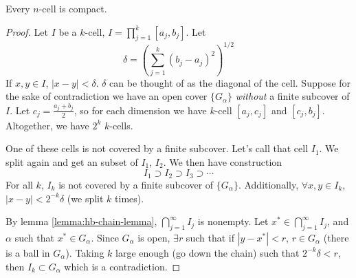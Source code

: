\begin{lemma}
    Every $n$-cell is compact.
\end{lemma}
\begin{proof}
    Let $I$ be a $k$-cell, $I = \prod_{j=1}^k[a_j, b_j]$. Let
    \[\delta = \left( \sum_{j=1}^k (b_j - a_j)^2 \right)^{1/2}\]
    If $x, y\in I$, $|x - y| < \delta$. $\delta$ can be thought of as the diagonal of the cell. Suppose for the sake of contradiction we have an open cover $\{G_\alpha\}$ \emph{without} a finite subcover of $I$. Let $c_j = \frac{a_j + b_j}{2}$, so for each dimension we have $k$-cell $[a_j, c_j]$ and $[c_j, b_j]$. Altogether, we have $2^k$ $k$-cells.

    One of these cells is not covered by a finite subcover. Let's call that cell $I_1$. We split again and get an subset of $I_1$, $I_2$. We then have construction
    \[I_1\supset I_2\supset I_3\supset \cdots\]
    For all $k$, $I_k$ is not covered by a finite subcover of $\{G_\alpha\}$. Additionally, $\forall x, y\in I_k$, $|x - y| < 2^{-k}\delta$ (we split $k$ times).

    By lemma \cref{lemma:hb-chain-lemma}, $\bigcap^\infty_{j=1}I_j$ is nonempty. Let $x^*\in \bigcap^\infty_{j=1}I_j$, and $\alpha$ such that $x^* \in G_\alpha$. Since $G_\alpha$ is open, $\exists r$ such that if $|y - x^*| < r$, $r\in G_\alpha$ (there is a ball in $G_\alpha$). Taking $k$ large enough (go down the chain) such that $2^{-k}\delta < r$, then $I_k\subset G_\alpha$ which is a contradiction.
\end{proof}